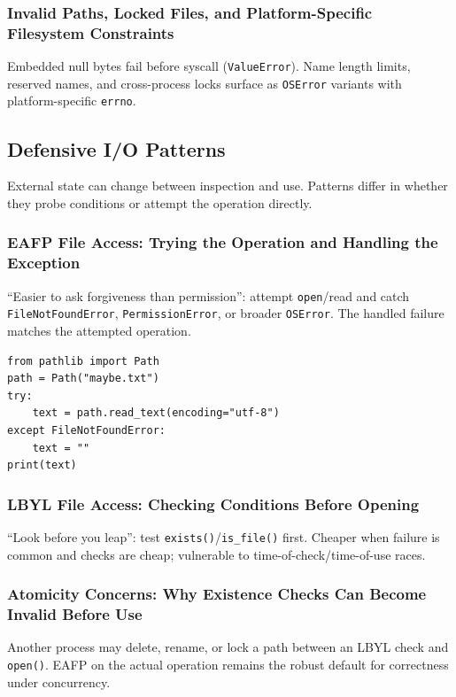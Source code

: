 \documentclass[a4paper,twoside]{report}
\begin{document}
\subsubsection{Invalid Paths, Locked Files, and Platform-Specific Filesystem Constraints}

Embedded null bytes fail before syscall (\texttt{ValueError}). Name length limits, reserved names, and cross-process locks surface as \texttt{OSError} variants with platform-specific \texttt{errno}.


\subsection{Defensive I/O Patterns}

External state can change between inspection and use. Patterns differ in whether they probe conditions or attempt the operation directly.

\subsubsection{EAFP File Access: Trying the Operation and Handling the Exception}

``Easier to ask forgiveness than permission'': attempt \texttt{open}/read and catch \texttt{FileNotFoundError}, \texttt{PermissionError}, or broader \texttt{OSError}. The handled failure matches the attempted operation.

\begin{verbatim}
from pathlib import Path
path = Path("maybe.txt")
try:
    text = path.read_text(encoding="utf-8")
except FileNotFoundError:
    text = ""
print(text)
\end{verbatim}

\subsubsection{LBYL File Access: Checking Conditions Before Opening}

``Look before you leap'': test \texttt{exists()}/\texttt{is\_file()} first. Cheaper when failure is common and checks are cheap; vulnerable to time-of-check/time-of-use races.

\subsubsection{Atomicity Concerns: Why Existence Checks Can Become Invalid Before Use}

Another process may delete, rename, or lock a path between an LBYL check and \texttt{open()}. EAFP on the actual operation remains the robust default for correctness under concurrency.
\end{document}
